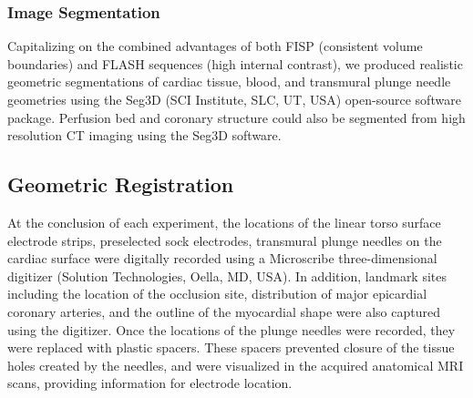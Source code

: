 \documentclass[twocolumn]{cinc}
\begin{document}
\subsubsection{Image Segmentation}

Capitalizing on the combined advantages of both FISP (consistent volume boundaries) and FLASH sequences (high internal contrast), we  produced realistic geometric segmentations of cardiac tissue, blood, and  transmural plunge needle geometries using the Seg3D (SCI Institute, SLC, UT, USA) open-source software package. Perfusion bed and coronary structure could also be segmented from high resolution CT imaging using the Seg3D software. 

%

\subsection{Geometric Registration}


At the conclusion of each experiment, the locations of the linear torso surface electrode strips, preselected sock electrodes, transmural plunge needles on the cardiac surface were digitally recorded using a Microscribe three-dimensional digitizer (Solution Technologies, Oella, MD, USA). In addition, landmark sites including the location of the occlusion site, distribution of major epicardial coronary arteries, and the outline of the myocardial shape were also captured using the digitizer. Once the locations of the plunge needles were recorded, they were replaced with plastic spacers. These spacers prevented closure of the tissue holes created by the needles, and were visualized in the acquired anatomical MRI scans, providing information for electrode location.
\end{document}
